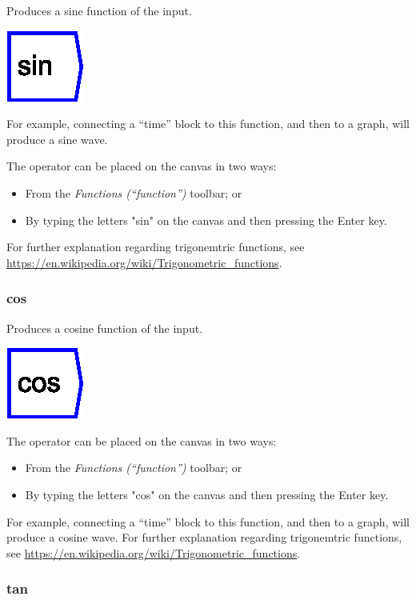 \label{Operation:sin} Produces a sine function of the input.

\includegraphics{images/sine}

For example, connecting a ``time'' block to this function, and then
to a graph, will produce a sine wave.

The operator can be placed on the canvas in two ways:
\begin{itemize}
\item From the \emph{Functions (``function'')} toolbar; or 
\item By typing the letters "sin" on the canvas and then pressing the
Enter key. 
\end{itemize}
For further explanation regarding trigonemtric functions, see \url{https://en.wikipedia.org/wiki/Trigonometric_functions}.

\subsubsection{cos}

\label{Operation:cos} Produces a cosine function of the input.

\includegraphics{images/cosine}

The operator can be placed on the canvas in two ways:
\begin{itemize}
\item From the \emph{Functions (``function'')} toolbar; or 
\item By typing the letters "cos" on the canvas and then pressing the
Enter key.
\end{itemize}
For example, connecting a ``time'' block to this function, and then
to a graph, will produce a cosine wave. For further explanation regarding
trigonemtric functions, see \url{https://en.wikipedia.org/wiki/Trigonometric_functions}.

\subsubsection{tan}

